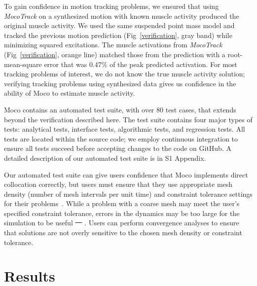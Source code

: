 \documentclass[10pt,letterpaper]{article}
\providecommand{\DIFaddtex}[1]{{\protect\color{blue}\uwave{#1}}} %
\providecommand{\DIFdeltex}[1]{{\protect\color{red}\sout{#1}}}                      %
\providecommand{\DIFaddbegin}{} %
\providecommand{\DIFaddend}{} %
\providecommand{\DIFdelbegin}{} %
\providecommand{\DIFdelend}{} %
\providecommand{\DIFadd}[1]{\texorpdfstring{\DIFaddtex{#1}}{#1}} %
\providecommand{\DIFdel}[1]{\texorpdfstring{\DIFdeltex{#1}}{}} %
\newcommand{\DIFscaledelfig}{0.5}
\newlength{\DIFdelgraphicswidth} %
\newlength{\DIFdelgraphicsheight} %
\newcommand{\DIFaddincludegraphics}[2][]{{\color{blue}\fbox{\DIFOincludegraphics[#1]{#2}}}} %
\newcommand{\DIFdelincludegraphics}[2][]{%
\sbox{\DIFdelgraphicsbox}{\DIFOincludegraphics[#1]{#2}}%
\settoboxwidth{\DIFdelgraphicswidth}{\DIFdelgraphicsbox} %
\settoboxtotalheight{\DIFdelgraphicsheight}{\DIFdelgraphicsbox} %
\scalebox{\DIFscaledelfig}{%
\parbox[b]{\DIFdelgraphicswidth}{\usebox{\DIFdelgraphicsbox}\\[-\baselineskip] \rule{\DIFdelgraphicswidth}{0em}}\llap{\resizebox{\DIFdelgraphicswidth}{\DIFdelgraphicsheight}{%
\setlength{\unitlength}{\DIFdelgraphicswidth}%
\begin{picture}(1,1)%
\thicklines\linethickness{2pt} %
{\color[rgb]{1,0,0}\put(0,0){\framebox(1,1){}}}%
{\color[rgb]{1,0,0}\put(0,0){\line( 1,1){1}}}%
{\color[rgb]{1,0,0}\put(0,1){\line(1,-1){1}}}%
\end{picture}%
}\hspace*{3pt}}} %
} %
\DeclareRobustCommand{\DIFaddbegin}{\DIFOaddbegin \let\includegraphics\DIFaddincludegraphics} %
\DeclareRobustCommand{\DIFaddend}{\DIFOaddend \let\includegraphics\DIFOincludegraphics} %
\DeclareRobustCommand{\DIFdelbegin}{\DIFOdelbegin \let\includegraphics\DIFdelincludegraphics} %
\DeclareRobustCommand{\DIFdelend}{\DIFOaddend \let\includegraphics\DIFOincludegraphics} %
\begin{document}
To gain confidence in motion tracking problems, we ensured that using \textit{MocoTrack} on a synthesized motion with known muscle activity produced the original muscle activity. We used the same suspended point mass model and tracked the previous motion prediction (Fig~\ref{verification}, gray band) while minimizing squared excitations. The muscle activations from \textit{MocoTrack} (Fig~\ref{verification}, orange line) matched those from the prediction with a root-mean-square error that was 0.47\% of the peak predicted activation. For most tracking problems of interest, we do not know the true muscle activity solution; verifying tracking problems using synthesized data gives us confidence in the ability of Moco to estimate muscle activity.

Moco contains an automated test suite, with over 80 test cases, that extends beyond the verification described here. The test suite contains four major types of tests: analytical tests, interface tests, algorithmic tests, and regression tests. All tests are located within the source code; we employ continuous integration to ensure all tests succeed before accepting changes to the code on GitHub. A detailed description of our automated test suite is in S1 Appendix.

Our automated test suite can give users confidence that Moco implements direct collocation correctly, but users must ensure that they use appropriate mesh density (number of mesh intervals per unit time) and constraint tolerance settings for their problems~\cite{Hicks:2015bo}. While a problem with a coarse mesh may meet the user's specified constraint tolerance, errors in the dynamics may be too large for the simulation to be useful \DIFdelbegin \DIFdel{~\mbox{%
\cite{Betts:2010}}\hspace{0pt}%
}\DIFdelend \DIFaddbegin \DIFadd{(\hspace{1sp}\mbox{%
\cite{Betts:2010}}\hspace{0pt}%
, section 4.7)}\DIFaddend . Users can perform convergence analyses to ensure that solutions are not overly sensitive to the chosen mesh density or constraint tolerance.

\section*{Results}
\end{document}
